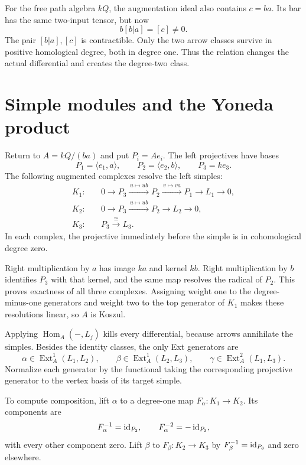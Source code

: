 For the free path algebra $kQ$, the augmentation ideal also contains $c=ba$.
Its bar has the same two-input tensor, but now
\[
 b[b|a]=[c]\ne0.
\]
The pair $[b|a],[c]$ is contractible.
Only the two arrow classes survive in positive homological degree, both in degree one.
Thus the relation changes the actual differential and creates the degree-two class.

\section{Simple modules and the Yoneda product}

Return to $A=kQ/(ba)$ and put $P_i=Ae_i$.
The left projectives have bases
\[
 P_1=\langle e_1,a\rangle,\qquad
 P_2=\langle e_2,b\rangle,\qquad P_3=ke_3.
\]
The following augmented complexes resolve the left simples:
\[
 \begin{aligned}
 K_1:&\quad 0\longrightarrow P_3
   \xrightarrow{\,u\mapsto ub\,}P_2
   \xrightarrow{\,v\mapsto va\,}P_1\longrightarrow L_1\longrightarrow0,\\
 K_2:&\quad 0\longrightarrow P_3
   \xrightarrow{\,u\mapsto ub\,}P_2\longrightarrow L_2\longrightarrow0,\\
 K_3:&\quad P_3\xrightarrow{\ \cong\ }L_3.
 \end{aligned}
\]
In each complex, the projective immediately before the simple is in cohomological degree zero.

Right multiplication by $a$ has image $ka$ and kernel $kb$.
Right multiplication by $b$ identifies $P_3$ with that kernel, and the same map resolves the radical of $P_2$.
This proves exactness of all three complexes.
Assigning weight one to the degree-minus-one generators and weight two to the top generator of $K_1$ makes these resolutions linear, so $A$ is Koszul.

Applying $\operatorname{Hom}_A(-,L_j)$ kills every differential, because arrows annihilate the simples.
Besides the identity classes, the only Ext generators are
\[
 \alpha\in\operatorname{Ext}^1_A(L_1,L_2),\qquad
 \beta\in\operatorname{Ext}^1_A(L_2,L_3),\qquad
 \gamma\in\operatorname{Ext}^2_A(L_1,L_3).
\]
Normalize each generator by the functional taking the corresponding projective generator to the vertex basis of its target simple.

To compute composition, lift $\alpha$ to a degree-one map $F_\alpha:K_1\to K_2$.
Its components are
\[
 F_\alpha^{-1}=\operatorname{id}_{P_2},
 \qquad F_\alpha^{-2}=-\operatorname{id}_{P_3},
\]
with every other component zero.
Lift $\beta$ to $F_\beta:K_2\to K_3$ by $F_\beta^{-1}=\operatorname{id}_{P_3}$ and zero elsewhere.

